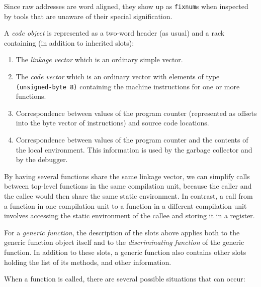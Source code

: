 Since raw addresses are word aligned, they show up as \texttt{fixnum}s
when inspected by tools that are unaware of their special
signification.

A \emph{code object} is represented as a two-word header (as usual)
and a rack containing (in addition to inherited slots):

\begin{enumerate}
\item The \emph{linkage vector} which is an ordinary \commonlisp{} simple
  vector.
\item The \emph{code vector} which is an ordinary \commonlisp{} vector with
  elements of type \texttt{(unsigned-byte 8)} containing the machine
  instructions for one or more functions.
\item Correspondence between values of the program counter
  (represented as offsets into the byte vector of instructions) and
  source code locations.
\item Correspondence between values of the program counter and the
  contents of the local environment.  This information is used by the
  garbage collector and by the debugger.
\end{enumerate}

By having several functions share the same linkage vector, we can
simplify calls between top-level functions in the same compilation
unit, because the caller and the callee would then share the
same static environment.  In contrast, a call from a function in one
compilation unit to a function in a different compilation unit
involves accessing the static environment of the callee and storing it
in a register.

For a \emph{generic function}, the description of the slots above
applies both to the generic function object itself and to the
\emph{discriminating function} of the generic function.  In addition
to these slots, a generic function also contains other slots holding
the list of its methods, and other information.

When a function is called, there are several possible situations that
can occur:

